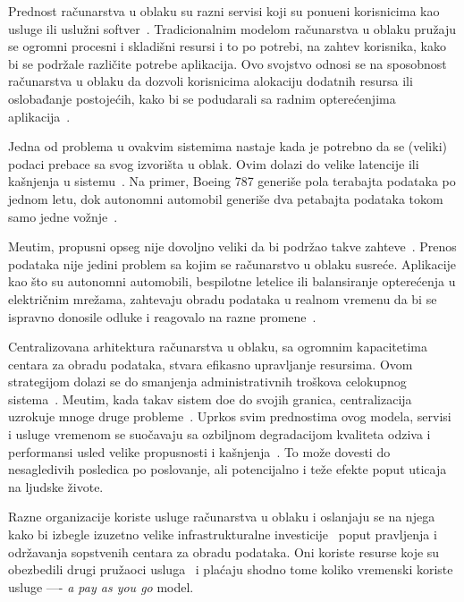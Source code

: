 Prednost ra\v cunarstva u oblaku su razni servisi koji su ponu\dj eni korisnicima kao usluge ili uslu\v zni softver~\cite{Vogels}. Tradicionalnim modelom ra\v cunarstva u oblaku pružaju se ogromni procesni i skladi\v sni resursi i to po potrebi, na zahtev korisnika, kako bi se podr\v zale razli\v cite potrebe aplikacija. Ovo svojstvo odnosi se na sposobnost ra\v cunarstva u oblaku da dozvoli korisnicima alokaciju dodatnih resursa ili oslobađanje postoje\'cih, kako bi se podudarali sa radnim optere\'cenjima aplikacija~\cite{AssuncaoVB18}. 

Jedna od problema u ovakvim sistemima nastaje kada je potrebno da se (veliki) podaci prebace sa svog izvori\v sta u oblak. Ovim dolazi do velike latencije ili ka\v snjenja u sistemu~\cite {HossainRH18}. Na primer, Boeing 787 generi\v se pola terabajta podataka po jednom letu, dok autonomni automobil generi\v se dva petabajta podataka tokom samo jedne vo\v znje~\cite{CaoZS18}. 

Me\dj utim, propusni opseg nije dovoljno veliki da bi podr\v zao takve zahteve~\cite{CaoZS18}. Prenos podataka nije jedini problem sa kojim se ra\v cunarstvo u oblaku susre\'ce. Aplikacije kao \v sto su autonomni automobili, bespilotne letelice ili balansiranje optere\'cenja u elektri\v cnim mre\v zama, zahtevaju obradu podataka u realnom vremenu da bi se ispravno donosile odluke i reagovalo na razne promene~\cite{CaoZS18}.

Centralizovana arhitektura ra\v cunarstva u oblaku, sa ogromnim kapacitetima centara za obradu podataka, stvara efikasno upravljanje resursima. Ovom strategijom dolazi se do smanjenja administrativnih tro\v skova celokupnog sistema~\cite{BariBEGPRZZ13}. Me\dj utim, kada takav sistem do\dj e do svojih granica, centralizacija uzrokuje mnoge druge probleme~\cite{GunawiHSLSAE16, LopezMEDHIBFR15}. Uprkos svim prednostima ovog modela, servisi i usluge vremenom se suo\v cavaju sa ozbiljnom degradacijom kvaliteta odziva i performansi usled velike propusnosti i ka\v snjenja~\cite{KarimIWGSYO16}. To mo\v ze dovesti do nesagledivih posledica po poslovanje, ali potencijalno i te\v ze efekte poput uticaja na ljudske \v zivote. 

Razne organizacije koriste usluge ra\v cunarstva u oblaku i oslanjaju se na njega kako bi izbegle izuzetno velike infrastrukturalne investicije~\cite {MonsalveCC18} poput pravljenja i odr\v zavanja sopstvenih centara za obradu podataka. Oni koriste resurse koje su obezbedili drugi pru\v zaoci usluga~\cite{Satyanarayanan17} i pla\'caju shodno tome koliko vremenski koriste usluge ---- \emph{a pay as you go} model.

